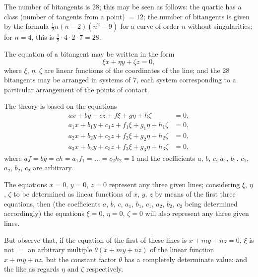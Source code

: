\documentclass[11pt,a4paper]{article}
\theoremstyle{plain}
\theoremstyle{definition}
\theoremstyle{remark}
\begin{document}
The number of bitangents is 28; this may be seen as follows: the quartic has a class (number of tangents from a point) $= 12$; the number of bitangents is given by the formula $\frac{1}{2}n(n-2)(n^2-9)$ for a curve of order $n$ without singularities; for $n=4$, this is $\frac{1}{2}\cdot 4\cdot 2\cdot 7 = 28$.

The equation of a bitangent may be written in the form
\[
\xi x + \eta y + \zeta z = 0,
\]
where $\xi$, $\eta$, $\zeta$ are linear functions of the coordinates of the line; and the 28 bitangents may be arranged in systems of 7, each system corresponding to a particular arrangement of the points of contact.

The theory is based on the equations
\begin{align*}
ax + by + cz + f\xi + g\eta + h\zeta &= 0,\\
a_1x + b_1y + c_1z + f_1\xi + g_1\eta + h_1\zeta &= 0,\\
a_2x + b_2y + c_2z + f_2\xi + g_2\eta + h_2\zeta &= 0,\\
a_3x + b_3y + c_3z + f_3\xi + g_3\eta + h_3\zeta &= 0,
\end{align*}
where $af = bg = ch = a_1f_1 = \ldots = c_2h_2 = 1$ and the coefficients $a$, $b$, $c$, $a_1$, $b_1$, $c_1$, $a_2$, $b_2$, $c_2$ are arbitrary.

The equations $x=0$, $y=0$, $z=0$ represent any three given lines; considering $\xi$, $\eta$, $\zeta$ to be determined as linear functions of $x$, $y$, $z$ by means of the first three equations, then (the coefficients $a$, $b$, $c$, $a_1$, $b_1$, $c_1$, $a_2$, $b_2$, $c_2$ being determined accordingly) the equations $\xi=0$, $\eta=0$, $\zeta=0$ will also represent any three given lines.

But observe that, if the equation of the first of these lines is $x + my + nz = 0$, $\xi$ is not $=$ an arbitrary multiple $\theta(x + my + nz)$ of the linear function $x + my + nz$, but the constant factor $\theta$ has a completely determinate value: and the like as regards $\eta$ and $\zeta$ respectively.
\end{document}
